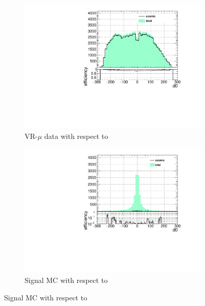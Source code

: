 \begin{figure}[!ht]
  \begin{subfigure}[b]{0.4\textwidth}
  	\includegraphics[width=\textwidth]{figures/cosmics/wider_tag_ratio_d0.pdf}
  	\caption{VR-$\mu$ data with respect to \dz}
  \end{subfigure}
  \begin{subfigure}[b]{0.4\textwidth}
  	\includegraphics[width=\textwidth]{figures/cosmics/mc_300_ratio_d0.pdf}
  	\caption{Signal \ac{MC} with respect to \dz}
  \end{subfigure}


\end{figure}
